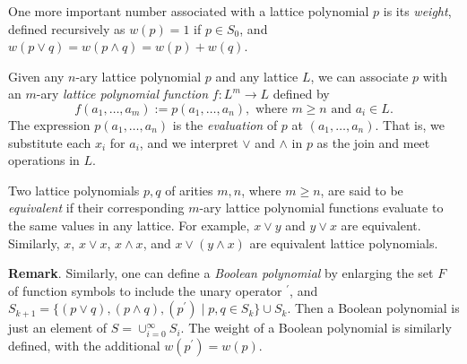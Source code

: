 \documentclass[12pt]{article}
\begin{document}
One more important number associated with a lattice polynomial $p$ is its \emph{weight}, defined recursively as $w(p)=1$ if $p\in S_0$, and $w(p\vee q)=w(p\wedge q)=w(p)+w(q)$.

Given any $n$-ary lattice polynomial $p$ and any lattice $L$, we can associate $p$ with an $m$-ary \emph{lattice polynomial function} $f:L^m\to L$ defined by $$f(a_1,\ldots,a_m):=p(a_1,\ldots,a_n),\mbox{ where }m\ge n\mbox{ and }a_i \in L.$$
The expression $p(a_1,\ldots,a_n)$ is the \emph{evaluation} of $p$ at $(a_1,\ldots,a_n)$.  That is, we substitute each $x_i$ for $a_i$, and we interpret $\vee$ and $\wedge$ in $p$ as the join and meet operations in $L$.

Two lattice polynomials $p,q$ of arities $m,n$, where $m\ge n$, are said to be \emph{equivalent} if their corresponding $m$-ary lattice polynomial functions evaluate to the same values in any lattice.  For example, $x\vee y$ and $y\vee x$ are equivalent.  Similarly, $x$, $x\vee x$, $x\wedge x$, and $x\vee (y\wedge x)$ are equivalent lattice polynomials.

\textbf{Remark}.  Similarly, one can define a \emph{Boolean polynomial} by enlarging the set $F$ of function symbols to include the unary operator $^{\prime}$, and $S_{k+1}=\lbrace (p\vee q), (p\wedge q), (p^{\prime}) \mid p,q\in S_k\rbrace\cup S_k$.  Then a Boolean polynomial is just an element of $S=\cup_{i=0}^{\infty} S_i$.  The weight of a Boolean polynomial is similarly defined, with the additional $w(p^{\prime})=w(p)$.
\end{document}
